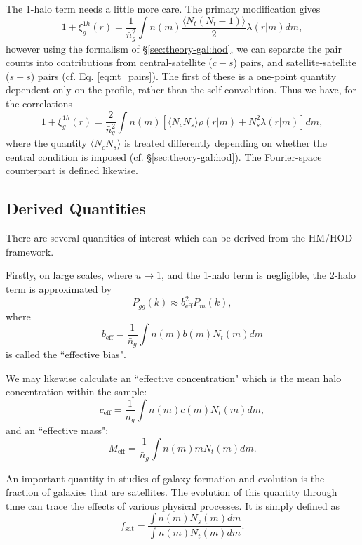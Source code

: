 \documentclass[5p]{elsarticle}
\begin{document}
The 1-halo term needs a little more care. The primary modification gives
\begin{equation}
\label{eq:galcoor1}
1 + \xi_g^{1h}(r) = \frac{1}{\bar{n}_g^2}\int n(m) \frac{\langle N_t(N_t-1) \rangle}{2} \lambda(r|m) dm,
\end{equation}
however using the formalism of \S\ref{sec:theory-gal:hod}, we can separate the pair counts into contributions from central-satellite ($c-s$) pairs, and satellite-satellite ($s-s$) pairs (cf. Eq. \ref{eq:nt_pairs}). The first of these is a one-point quantity dependent only on the profile, rather than the self-convolution. Thus we have, for the correlations
\begin{equation}
1 + \xi_g^{1h}(r) = \frac{2}{\bar{n}_g^2}\int n(m) \left[\langle N_c N_s \rangle \rho(r|m) + N_s^2 \lambda(r|m)\right] dm,
\end{equation}
where the quantity $\langle N_c N_s \rangle$ is treated differently depending on whether the central condition is imposed (cf. \S\ref{sec:theory-gal:hod}). The Fourier-space counterpart is defined likewise.




\subsection{Derived Quantities}
There are several quantities of interest which can be derived from the HM/HOD framework.

Firstly, on large scales, where $u\rightarrow1$, and the 1-halo term is negligible, the 2-halo term is approximated by
\begin{equation}
 P_{gg}(k) \approx b^2_\text{eff}P_m(k),
\end{equation}
where
\begin{equation}
\label{eq:beff}
 b_\text{eff} = \frac{1}{\bar{n}_g}\int n(m)b(m)N_t(m) dm
\end{equation}
is called the ``effective bias".

We may likewise calculate an ``effective concentration" which is the mean halo concentration within the sample:
\begin{equation}
     c_\text{eff} = \frac{1}{\bar{n}_g}\int n(m)c(m)N_t(m) dm,
\end{equation}
and an ``effective mass":
\begin{equation}
     M_\text{eff} = \frac{1}{\bar{n}_g}\int n(m)mN_t(m) dm.
\end{equation}

An important quantity in studies of galaxy formation and evolution is the fraction of galaxies that are satellites. The evolution of this quantity through time can trace the effects of various physical processes. It is simply defined as
\begin{equation}
    f_\text{sat} = \frac{\int n(m) N_s(m) dm}{\int n(m) N_t(m) dm}.
\end{equation}
\end{document}
